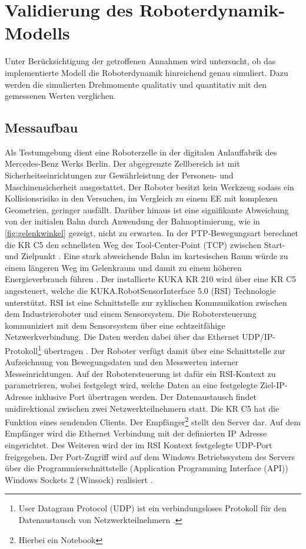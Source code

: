 \chapter{Validierung des Roboterdynamik-Modells}
\label{sec:modellvalidierung}
\label{cha:modellvalidierung}
%
Unter Berücksichtigung der getroffenen Annahmen wird untersucht, ob das implementierte Modell die Roboterdynamik hinreichend genau simuliert. Dazu werden die simulierten Drehmomente qualitativ und quantitativ mit den gemessenen Werten verglichen.
%
\section{Messaufbau}
Als Testumgebung dient eine Roboterzelle in der digitalen Anlauffabrik des Mercedes-Benz Werks Berlin.
Der abgegrenzte Zellbereich ist mit Sicherheitseinrichtungen zur Gewährleistung der Personen- und Maschinensicherheit ausgestattet.
Der Roboter besitzt kein Werkzeug sodass ein Kollisionsrisiko in den Versuchen, im Vergleich zu einem EE mit komplexen Geometrien, geringer ausfällt. Darüber hinaus ist eine signifikante Abweichung von der initialen Bahn durch Anwendung der Bahnoptimierung, wie in \ref{fig:gelenkwinkel} gezeigt, nicht zu erwarten. In der PTP-Bewegungsart berechnet die KR C5 den schnellsten Weg des Tool-Center-Point (TCP) zwischen Start- und Zielpunkt \cite[S.~429]{KSS.2023}. Eine stark abweichende Bahn im kartesischen Raum würde zu einem längeren Weg im Gelenkraum und damit zu einem höheren Energieverbrauch führen \cite[S.~59]{Eggers.2019}. 
%
Der installierte KUKA KR 210 wird über eine KR C5 angesteuert, welche die KUKA.RobotSensorInterface 5.0 (RSI) Technologie unterstützt. RSI ist eine Schnittstelle zur zyklischen Kommunikation zwischen dem Industrieroboter und einem Sensorsystem. Die Robotersteuerung kommuniziert mit dem Sensorsystem über eine echtzeitfähige Netzwerkverbindung. Die Daten werden dabei über das Ethernet UDP/IP-Protokoll\footnote{User Datagram Protocol (UDP) ist ein verbindungsloses Protokoll für den Datenaustausch von Netzwerkteilnehmern \cite{RSI.2020}.} übertragen \cite[S.~11]{RSI.2020}. Der Roboter verfügt damit über eine Schnittstelle zur Aufzeichnung von Bewegungsdaten und den Messwerten interner Messeinrichtungen.  
%
Auf der Robotersteuerung ist daf{\"u}r ein RSI-Kontext zu parametrieren, wobei festgelegt wird, welche Daten an eine festgelegte Ziel-IP-Adresse inklusive Port {\"u}bertragen werden\cite[S.~43]{RSI.2020}.  Der Datenaustausch findet unidirektional zwischen zwei Netzwerkteilnehmern statt. Die KR C5 hat die Funktion eines sendenden Clients. Der Empfänger\footnote{Hierbei ein Notebook} stellt den Server dar. Auf dem Empfänger wird die Ethernet Verbindung mit der definierten IP Adresse eingerichtet. Des Weiteren wird der im RSI Kontext festgelegte UDP-Port freigegeben. Der Port-Zugriff wird auf dem Windows Betriebssystem des Servers über die Programmierschnittstelle (Application Programming Interface (API)) Windows Sockets 2 (Winsock) realisiert \cite{Winsock.2023}. 
